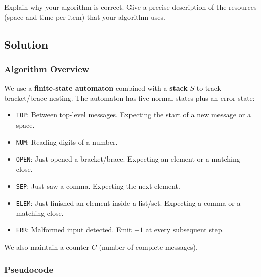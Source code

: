 \documentclass[11pt]{article}
\begin{document}
Explain why your algorithm is correct. Give a precise description of the resources (space and time per item) that your algorithm uses.

\subsection*{Solution}

\subsubsection*{Algorithm Overview}

We use a \textbf{finite-state automaton} combined with a \textbf{stack} $S$ to track bracket/brace nesting. The automaton has five normal states plus an error state:
\begin{itemize}
\item \texttt{TOP}: Between top-level messages. Expecting the start of a new message or a space.
\item \texttt{NUM}: Reading digits of a number.
\item \texttt{OPEN}: Just opened a bracket/brace. Expecting an element or a matching close.
\item \texttt{SEP}: Just saw a comma. Expecting the next element.
\item \texttt{ELEM}: Just finished an element inside a list/set. Expecting a comma or a matching close.
\item \texttt{ERR}: Malformed input detected. Emit $-1$ at every subsequent step.
\end{itemize}
We also maintain a counter $C$ (number of complete messages).


\subsubsection*{Pseudocode}
\end{document}
